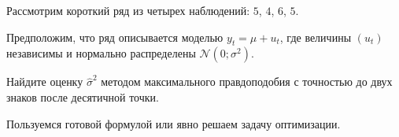 
\begin{question}
Рассмотрим короткий ряд из четырех наблюдений: \(5\), \(4\), \(6\), \(5\).

Предположим, что ряд описывается моделью \(y_t = \mu + u_t\), где величины \((u_t)\) независимы
и нормально распределены \(\mathcal{N}(0;\sigma^2)\).

Найдите оценку \(\hat\sigma^2\) методом максимального правдоподобия с точностью до двух знаков после десятичной точки.
\end{question}

\begin{solution}
Пользуемся готовой формулой или явно решаем задачу оптимизации.
\end{solution}

